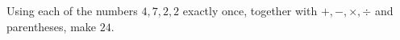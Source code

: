 Using each of the numbers $4,7,2,2$ exactly once, together with $+,-,\times,\div$ and parentheses, make $24$.
